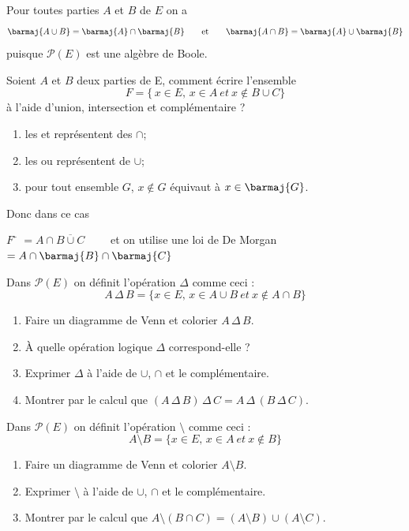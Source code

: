 \documentclass[a4paper,12pt,french]{book}
\begin{document}
\begin{propriete}
Pour toutes parties $A$ et $B$ de $E$ on a
$$\barmaj{A\cup B}=\barmaj{A}\cap\barmaj{B}\qquad\text{et}\qquad\barmaj{A\cap B}=\barmaj{A}\cup\barmaj{B}$$
puisque  $\mathcal{P}(E)$  est une algèbre de Boole.
\end{propriete}
\begin{methode}[]
Soient $A$ et $B$ deux parties de E, comment écrire l'ensemble $$F=\{\,x\in E,\,x\in A\:et\:x\notin B\cup C\}$$
à l'aide d'union, intersection et complémentaire ?\\

\begin{enumerate}[--]
	\item 	les \og et\fg{} représentent des $\cap$;
	\item 	les \og ou\fg{} représentent de $\cup$;
	\item 	pour tout ensemble $G$, $x\notin G$ équivaut à $x\in\barmaj{G}$.
\end{enumerate}

Donc dans ce cas
\begin{tabbing}
$F$ \= $=A\cap\overline{B\cup C}\qquad$ et on utilise une loi de De Morgan\\
	\> $=A\cap \barmaj{B}\cap \barmaj{C}$
\end{tabbing}
\end{methode}

\begin{exercice}[]
Dans $\mathcal{P}(E)$ on définit l'opération $\Delta$ comme ceci :
$$A\,\Delta\,B=\{x\in E,\, x\in A\cup B\:et\:x\notin{A\cap B}\}$$
\begin{enumerate}[\bfseries 1.]
	\item 	Faire un diagramme de Venn et colorier $A\,\Delta\,B$.
	\item 	À quelle opération logique $\Delta$ correspond-elle ?
	\item 	Exprimer $\Delta$ à l'aide de $\cup$, $\cap$ et le complémentaire.
	\item 	Montrer par le calcul que $(A\,\Delta\,B)\,\Delta\,C =A\,\Delta\,(B\,\Delta\,C)$.
\end{enumerate}
\end{exercice}

\begin{exercice}[]
Dans $\mathcal{P}(E)$ on définit l'opération $\setminus$ comme ceci :
$$A\setminus B=\{x\in E,\, x\in A\:et\:x\notin B\}$$
\begin{enumerate}[\bfseries 1.]
	\item 	Faire un diagramme de Venn et colorier $A\setminus B$.
	\item 	Exprimer $\setminus$ à l'aide de $\cup$, $\cap$ et le complémentaire.
	\item 	Montrer par le calcul que $A\setminus (B\cap C)=(A\setminus B)\cup(A\setminus C)$.
\end{enumerate}
\end{exercice}
\end{document}
